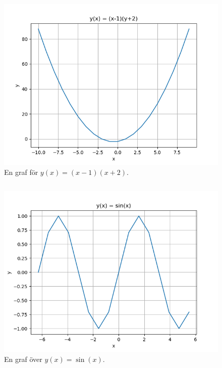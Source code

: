 \begin{frame}
  \begin{figure}
    \includegraphics[height=0.8\textheight]{fig/plot_f.png}
    \caption{En graf för \(y(x) = (x-1)(x+2)\).}
  \end{figure}
\end{frame}

\begin{frame}
  \inputminted[linenos,lastline=16]{python}{examples/plot_f.py}
\end{frame}

\begin{frame}
  \begin{figure}
    \includegraphics[height=0.8\textheight]{fig/plot_sin.png}
    \caption{En graf över \(y(x) = \sin(x)\).}
  \end{figure}
\end{frame}

\begin{frame}
  \inputminted[linenos,lastline=18]{python}{examples/plot_sin.py}
\end{frame}
